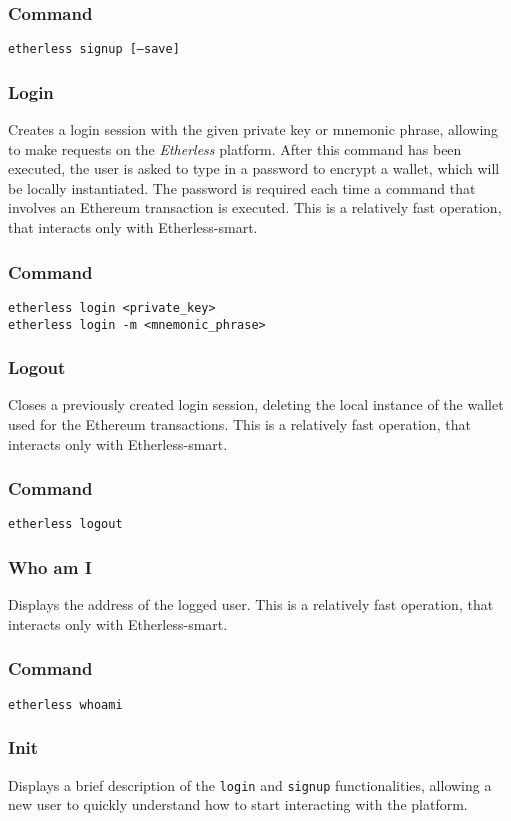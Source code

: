 	\subsubsection*{Command}
	\texttt{etherless signup [---save]}
	\subsubsection{Login}
	Creates a login session with the given private key or mnemonic phrase, allowing to make requests on the \textit{Etherless} platform. After this command has been executed, the user is asked to type in a password to encrypt a wallet, which will be locally instantiated. The password is required each time a command that involves an Ethereum transaction is executed. This is a relatively fast operation, that interacts only with Etherless-smart.
	\subsubsection*{Command}
	\texttt{etherless login <private\_key>} \\
	\texttt{etherless login -m <mnemonic\_phrase>}
	\subsubsection{Logout}
	Closes a previously created login session, deleting the local instance of the wallet used for the Ethereum transactions. This is a relatively fast operation, that interacts only with Etherless-smart.
	\subsubsection*{Command}
	\texttt{etherless logout}
	\subsubsection{Who am I}
	Displays the address of the logged user. This is a relatively fast operation, that interacts only with Etherless-smart.
	\subsubsection*{Command}
	\texttt{etherless whoami}
	\subsubsection{Init}
	Displays a brief description of the \texttt{login} and \texttt{signup} functionalities, allowing a new user to quickly understand how to start interacting with the platform.
